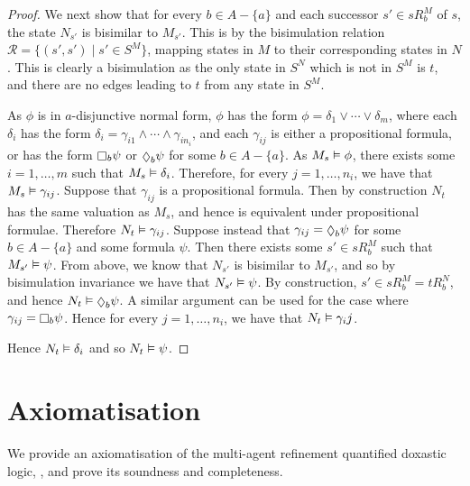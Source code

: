 \begin{proof}
We next show that for every $b \in A - \{a\}$ and each successor $s' \in sR^M_b$
of $s$, the state $N_{s'}$ is bisimilar to $M_{s'}$. This is by the bisimulation
relation $\mathcal{R} = \{(s', s') \mid s' \in S^M \}$, mapping states in
$M$ to their corresponding states in $N$. This is clearly a bisimulation as the
only state in $S^N$ which is not in $S^M$ is $t$, and there are no edges leading
to $t$ from any state in $S^M$.

As $\phi$ is in $a$-disjunctive normal form, $\phi$ has the form $\phi =
\delta_1 \lor \cdots \lor \delta_m$, where each $\delta_i$ has the form
$\delta_i = \gamma_{i1} \land \cdots \land \gamma_{in_i}$, and each $\gamma_{ij}$ is
either a propositional formula, or has the form $\knows_b \psi$ or $\suspects_b
\psi$ for some $b \in A - \{a\}$.  As $M_s \vDash \phi$, there exists some $i
= 1, \dots, m$ such that $M_s \vDash \delta_i$. Therefore, for every $j = 1,
\dots, n_i$, we have that $M_s \vDash \gamma_{ij}$. Suppose that
$\gamma_{ij}$ is a propositional formula. Then by construction $N_t$ has the
same valuation as $M_s$, and hence is equivalent under propositional formulae.
Therefore $N_t \vDash \gamma_{ij}$.  Suppose instead that $\gamma_{ij} =
\suspects_b \psi$ for some $b \in A - \{a\}$ and some formula $\psi$. Then there
exists some $s' \in sR^M_b$ such that $M_{s'} \vDash \psi$. From above, we
know that $N_{s'}$ is bisimilar to $M_{s'}$, and so by bisimulation invariance
we have that $N_{s'} \vDash \psi$.  By construction, $s' \in sR^M_b = tR^N_b$,
and hence $N_t \entails \suspects_b \psi$. A similar argument can be used for
the case where $\gamma_{ij} = \knows_b \psi$. Hence for every $j = 1, \dots,
n_i$, we have that $N_t \vDash \gamma_ij$.

Hence $N_t \vDash \delta_i$ and so $N_t \vDash \psi$.
\end{proof}

\section{Axiomatisation}

We provide an axiomatisation of the multi-agent refinement quantified doxastic
logic, \logicKDF{}, and prove its soundness and completeness.

